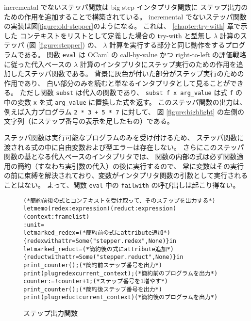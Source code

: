 incremental でないステッパ関数は big-step インタプリタ関数に
ステップ出力のための作用を追加することで構築されている。
incremental でないステッパ関数の実装は図\ref{figure:old-stepper}のようになる。
これは、 \ref{chapter:try-with} 章で示した
コンテキストをリストとして定義した場合の
try-with と型無し $\lambda$ 計算のステッパ (図 \ref{figure:stepper}) の、
$\lambda$ 計算を実行する部分と同じ動作をするプログラムである。
関数 \texttt{eval} は OCaml の call-by-value かつ right-to-left
の評価戦略に従った代入ベースの $\lambda$
計算のインタプリタにステップ実行のための作用を追加したステッパ関数である。
背景に灰色が付いた部分がステップ実行のための作用であり、
白い部分のみを読むと単なるインタプリタとして見ることができる。
ただし関数 \texttt{subst} は代入の関数であり、
\texttt{subst f x arg\_value} は式 \texttt{f} の中の変数
\texttt{x} を式 \texttt{arg\_value} に置換した式を返す。
このステッパ関数の出力は、
例えば入力プログラム \texttt{2 * 3 + 5 * 7} に対して、
図 \ref{figure:highlight} の左側の文字列（にステップ番号の表示を足したもの）である。

ステッパ関数は実行可能なプログラムのみを受け付けるため、
ステッパ関数に渡される式の中に自由変数および型エラーは存在しない。
さらにこのステッパ関数の基となる代入ベースのインタプリタでは、
関数の内部の式は必ず関数適用の簡約（すなわち実引数の代入）の後に実行するので、
常に変数はその実行の前に束縛を解決されており、変数がインタプリタ関数の引数として実行されることはない。
よって、関数 \texttt{eval} 中の \texttt{failwith} の呼び出しは起こり得ない。

\begin{figure}[t]
\begin{spacing}{0.8}
\begin{alltt}
(* 簡約前後の式とコンテキストを受け取って、そのステップを出力する *)
let memo (redex : expression) (reduct : expression) (context : frame list)
  : unit =
  let marked\_redex =                            (* 簡約前の式に attribute 追加 *)
    \{redex with attr = Some ("stepper.redex", None)\} in
  let marked\_reduct =                           (* 簡約後の式に attribute 追加 *)
    \{reduct with attr = Some ("stepper.reduct", None)\} in
  print\_counter ();                                 (* 簡約前ステップ番号を出力 *)
  print (plug redex current\_context);               (* 簡約前のプログラムを出力 *)
  counter := !counter + 1;                          (* ステップ番号を 1 増やす *)
  print\_counter ();                                 (* 簡約後ステップ番号を出力 *)
  print (plug reduct current\_context)               (* 簡約後のプログラムを出力 *)
\end{alltt}
\end{spacing}
\caption{ステップ出力関数}
\label{figure:memo}
\end{figure}

